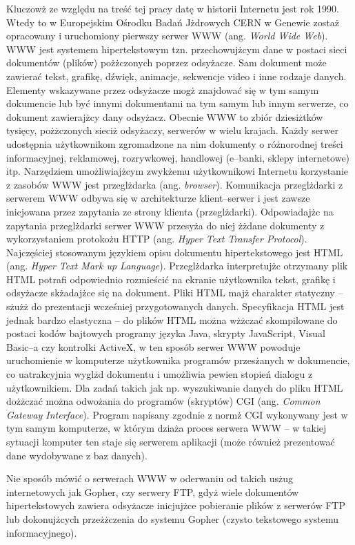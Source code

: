 Kluczowż ze względu na treść tej pracy datę w historii Internetu jest rok 1990. Wtedy to w Europejskim Ośrodku
Badań Jżdrowych CERN w Genewie zostaż opracowany i uruchomiony pierwszy serwer WWW (ang. \emph{World Wide Web}). WWW
jest systemem hipertekstowym tzn. przechowujżcym dane w postaci sieci dokumentów (plików) pożżczonych poprzez
odsyżacze. Sam dokument może zawierać tekst, grafikę, dźwięk, animacje,  sekwencje video i inne rodzaje danych.
Elementy wskazywane przez odsyżacze mogż znajdować się w tym samym dokumencie lub być innymi dokumentami na tym
samym lub innym serwerze, co dokument zawierajżcy dany odsyżacz. Obecnie WWW to zbiór dziesiżtków tysięcy,
pożżczonych sieciż odsyżaczy, serwerów w wielu krajach. Każdy serwer udostępnia użytkownikom zgromadzone na nim
dokumenty o różnorodnej treści informacyjnej, reklamowej, rozrywkowej, handlowej (e--banki, sklepy internetowe) itp.
Narzędziem umożliwiajżcym zwykżemu użytkownikowi Internetu korzystanie z zasobów WWW jest przeglżdarka
(ang. \emph{browser}). Komunikacja przeglżdarki z serwerem WWW odbywa się w architekturze klient--serwer i jest
zawsze inicjowana przez zapytania ze strony klienta (przeglżdarki). Odpowiadajżc na zapytania przeglżdarki serwer
WWW przesyża do niej żżdane dokumenty z wykorzystaniem protokożu HTTP (ang.
\emph{Hyper Text Transfer Protocol}). Najczęściej stosowanym językiem opisu dokumentu hipertekstowego jest HTML
(ang. \emph{Hyper Text Mark up Language}). Przeglżdarka interpretujżc otrzymany plik HTML potrafi odpowiednio rozmieścić
na ekranie użytkownika tekst, grafikę i odsyżacze skżadajżce się na dokument. Pliki HTML majż  charakter
statyczny -- sżużż do prezentacji wcześniej przygotowanych danych. Specyfikacja HTML jest jednak bardzo
elastyczna -- do plików HTML można wżżczać skompilowane do postaci kodów bajtowych programy języka Java,
skrypty JavaScript, Visual Basic--a czy kontrolki ActiveX, w ten sposób serwer WWW powoduje uruchomienie w
komputerze użytkownika  programów przesżanych w dokumencie, co uatrakcyjnia wyglżd dokumentu i umożliwia pewien
stopień dialogu z użytkownikiem. Dla zadań takich jak np. wyszukiwanie danych do pliku HTML dożżczać można
odwożania do programów (skryptów) CGI (ang. \emph{Common Gateway Interface}). Program napisany zgodnie z normż CGI
wykonywany jest w tym samym komputerze, w którym dziaża proces serwera WWW -- w takiej sytuacji komputer ten
staje się serwerem aplikacji (może również prezentować dane wydobywane z baz danych).

Nie sposób mówić o serwerach WWW w oderwaniu od takich usżug internetowych jak
Gopher, czy serwery FTP, gdyż wiele dokumentów hipertekstowych zawiera odsyżacze inicjujżce pobieranie plików z
serwerów FTP lub dokonujżcych przeżżczenia do systemu Gopher (czysto tekstowego systemu informacyjnego).

